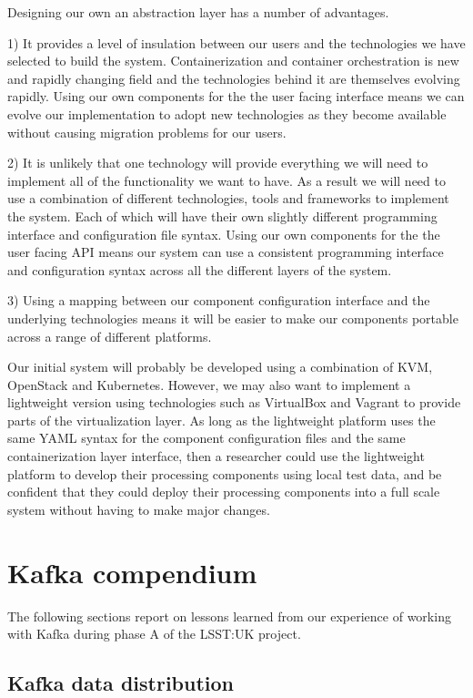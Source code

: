 \documentclass{article}
\newcommand{\yaml} {YAML\xspace}
\newcommand{\openstack} {OpenStack\xspace}
\newcommand{\kafka} {Kafka\xspace}
\newcommand{\kubernetes} {Kubernetes\xspace}
\newcommand{\virtualbox} {VirtualBox\xspace}
\newcommand{\vagrant} {Vagrant\xspace}
\newcommand{\kvm} {KVM\xspace}
\newcommand{\phasea} {phase A\xspace}
\newcommand{\lsstuk} {LSST:UK\xspace}
\begin{document}
Designing our own an abstraction layer has a number of advantages.

1) It provides a level of insulation between our users and the technologies we have selected to build the system. Containerization and container orchestration is new and rapidly changing field and the technologies behind it are themselves evolving rapidly.
Using our own components for the the user facing interface means we can evolve our implementation to adopt new technologies as they become available without causing migration problems for our users.

2) It is unlikely that one technology will provide everything we will need to implement all of the functionality we want to have. As a result we will need to use a combination of different technologies, tools and frameworks to implement the system. Each of which will have their own slightly different programming interface and configuration file syntax.
Using our own components for the the user facing API means our system can use a consistent programming interface and configuration syntax across all the different layers of the system.

3) Using a mapping between our component configuration interface and the underlying technologies means it will be easier to make our components portable across a range of different platforms.

Our initial system will probably be developed using a combination of \kvm, \openstack and \kubernetes. However, we may also want to implement a lightweight version using technologies such as \virtualbox and \vagrant to provide parts of the virtualization layer.
As long as the lightweight platform uses the same \yaml syntax for the component configuration files and the same containerization layer interface, then a researcher could use the lightweight platform to develop their processing components using local test data, and be confident that they could deploy their processing components into a full scale system without having to make major changes.

\section{Kafka compendium}
\label{kafka-compendium}

The following sections report on lessons learned from our experience of working with \kafka during \phasea of the \lsstuk project.

\subsection{Kafka data distribution}
\label{kafka-data-distribution}
\end{document}
